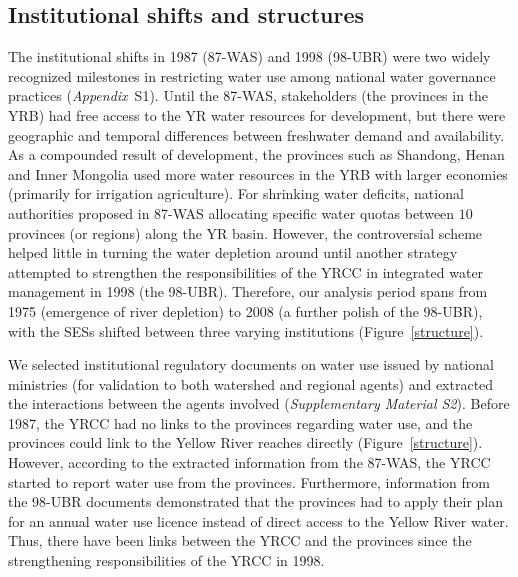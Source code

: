 
\subsection{Institutional shifts and structures}
\label{results-1}

The institutional shifts in 1987 (87-WAS) and 1998 (98-UBR) were two widely recognized milestones in restricting water use among national water governance practices (\textit{Appendix}~S1).
Until the 87-WAS, stakeholders (the provinces in the YRB) had free access to the YR water resources for development, but there were geographic and temporal differences between freshwater demand and availability.
As a compounded result of development, the provinces such as Shandong, Henan and Inner Mongolia used more water resources in the YRB with larger economies (primarily for irrigation agriculture).
For shrinking water deficits, national authorities proposed in 87-WAS allocating specific water quotas between $10$ provinces (or regions) along the YR basin.
However, the controversial scheme helped little in turning the water depletion around until another strategy attempted to strengthen the responsibilities of the YRCC in integrated water management in 1998 (the 98-UBR).
Therefore, our analysis period spans from 1975 (emergence of river depletion) to 2008 (a further polish of the 98-UBR), with the SESs shifted between three varying institutions (Figure~\ref{structure}).

We selected institutional regulatory documents on water use issued by national ministries (for validation to both watershed and regional agents) and extracted the interactions between the agents involved (\textit{Supplementary Material S2}).
Before 1987, the YRCC had no links to the provinces regarding water use, and the provinces could link to the Yellow River reaches directly (Figure~\ref{structure}).
However, according to the extracted information from the 87-WAS, the YRCC started to report water use from the provinces.
Furthermore, information from the 98-UBR documents demonstrated that the provinces had to apply their plan for an annual water use licence instead of direct access to the Yellow River water.
Thus, there have been links between the YRCC and the provinces since the strengthening responsibilities of the YRCC in 1998.

